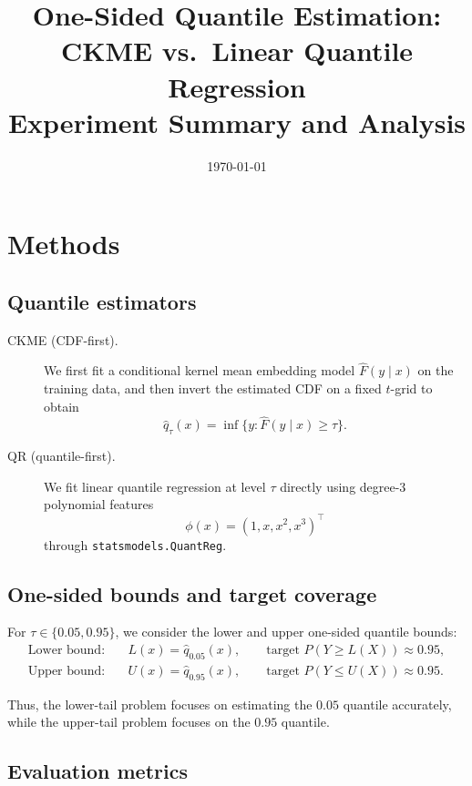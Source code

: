 \documentclass[11pt]{article}
\title{One-Sided Quantile Estimation: CKME vs.\ Linear Quantile Regression\\[0.5em]
	\large Experiment Summary and Analysis}
\author{}
\date{\today}
\begin{document}
	\maketitle
	
	\section{Methods}
	
	\subsection{Quantile estimators}
	
	\begin{description}
		\item[CKME (CDF-first).] We first fit a conditional kernel mean embedding model
		$\hat{F}(y \mid x)$ on the training data, and then invert the estimated CDF
		on a fixed $t$-grid to obtain
		\[
		\hat{q}_\tau(x) = \inf\{y : \hat{F}(y \mid x) \ge \tau\}.
		\]
		\item[QR (quantile-first).] We fit linear quantile regression at level $\tau$
		directly using degree-3 polynomial features
		\[
		\phi(x) = (1, x, x^2, x^3)^\top
		\]
		through \texttt{statsmodels.QuantReg}.
	\end{description}
	
	\subsection{One-sided bounds and target coverage}
	
	For $\tau \in \{0.05, 0.95\}$, we consider the lower and upper one-sided quantile bounds:
	\begin{align*}
		\text{Lower bound:}\quad & L(x) = \hat{q}_{0.05}(x),
		\qquad \text{target } P(Y \ge L(X)) \approx 0.95, \\
		\text{Upper bound:}\quad & U(x) = \hat{q}_{0.95}(x),
		\qquad \text{target } P(Y \le U(X)) \approx 0.95.
	\end{align*}
	
	Thus, the lower-tail problem focuses on estimating the $0.05$ quantile accurately,
	while the upper-tail problem focuses on the $0.95$ quantile.
	
	\subsection{Evaluation metrics}
	
\end{document}
